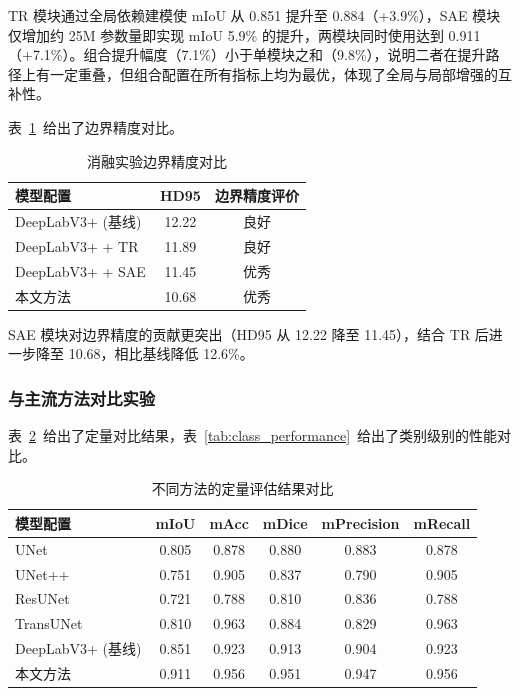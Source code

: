 TR 模块通过全局依赖建模使 mIoU 从 0.851 提升至 0.884（+3.9\%），SAE 模块仅增加约 25M 参数量即实现 mIoU 5.9\% 的提升，两模块同时使用达到 0.911（+7.1\%）。组合提升幅度（7.1\%）小于单模块之和（9.8\%），说明二者在提升路径上有一定重叠，但组合配置在所有指标上均为最优，体现了全局与局部增强的互补性。

表~\ref{tab:boundary}~给出了边界精度对比。

\begin{table}[htbp]
\centering
\caption{消融实验边界精度对比}
\label{tab:boundary}
\begin{tabular}{lcc}
\toprule
模型配置 & HD95 & 边界精度评价 \\
\midrule
DeepLabV3+ (基线) & 12.22 & 良好 \\
DeepLabV3+ + TR & 11.89 & 良好 \\
DeepLabV3+ + SAE & 11.45 & 优秀 \\
本文方法 & 10.68 & 优秀 \\
\bottomrule
\end{tabular}
\end{table}

SAE 模块对边界精度的贡献更突出（HD95 从 12.22 降至 11.45），结合 TR 后进一步降至 10.68，相比基线降低 12.6\%。

\subsubsection{与主流方法对比实验}

表~\ref{tab:comparison}~给出了定量对比结果，表~\ref{tab:class_performance}~给出了类别级别的性能对比。

\begin{table}[htbp]
\centering
\caption{不同方法的定量评估结果对比}
\label{tab:comparison}
\begin{tabular}{lccccc}
\toprule
模型配置 & mIoU & mAcc & mDice & mPrecision & mRecall \\
\midrule
UNet & 0.805 & 0.878 & 0.880 & 0.883 & 0.878 \\
UNet++ & 0.751 & 0.905 & 0.837 & 0.790 & 0.905 \\
ResUNet & 0.721 & 0.788 & 0.810 & 0.836 & 0.788 \\
TransUNet & 0.810 & 0.963 & 0.884 & 0.829 & 0.963 \\
DeepLabV3+ (基线) & 0.851 & 0.923 & 0.913 & 0.904 & 0.923 \\
本文方法 & 0.911 & 0.956 & 0.951 & 0.947 & 0.956 \\
\bottomrule
\end{tabular}
\end{table}

